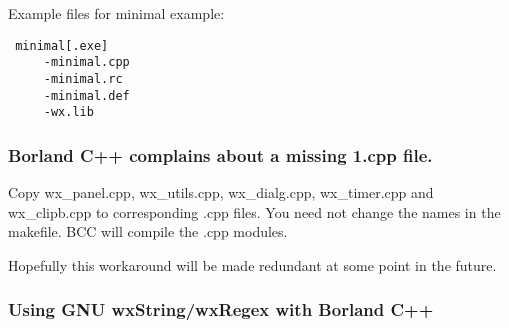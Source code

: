 Example files for minimal example:

\begin{verbatim}
 minimal[.exe]
     -minimal.cpp
     -minimal.rc
     -minimal.def
     -wx.lib
\end{verbatim}

\subsubsection{Borland C++ complains about a missing 1.cpp file.}

Copy wx\_panel.cpp, wx\_utils.cpp, wx\_dialg.cpp, wx\_timer.cpp and
wx\_clipb.cpp to corresponding .cpp files. You need not change the
names in the makefile. BCC will compile the .cpp modules.

Hopefully this workaround will be made redundant at some point
in the future.

\subsubsection{Using GNU wxString/wxRegex with Borland C++}

